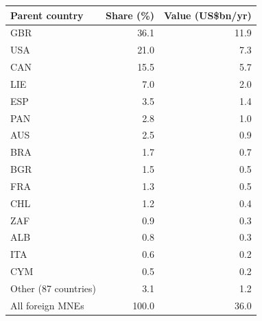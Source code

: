 \begin{tabular}{lrr}
\toprule
Parent country & Share (\%) & Value (US\$bn/yr) \\
\midrule
GBR & 36.1 & 11.9 \\
USA & 21.0 & 7.3 \\
CAN & 15.5 & 5.7 \\
LIE & 7.0 & 2.0 \\
ESP & 3.5 & 1.4 \\
PAN & 2.8 & 1.0 \\
AUS & 2.5 & 0.9 \\
BRA & 1.7 & 0.7 \\
BGR & 1.5 & 0.5 \\
FRA & 1.3 & 0.5 \\
CHL & 1.2 & 0.4 \\
ZAF & 0.9 & 0.3 \\
ALB & 0.8 & 0.3 \\
ITA & 0.6 & 0.2 \\
CYM & 0.5 & 0.2 \\
Other (87 countries) & 3.1 & 1.2 \\
\midrule
All foreign MNEs & 100.0 & 36.0 \\
\bottomrule
\end{tabular}
